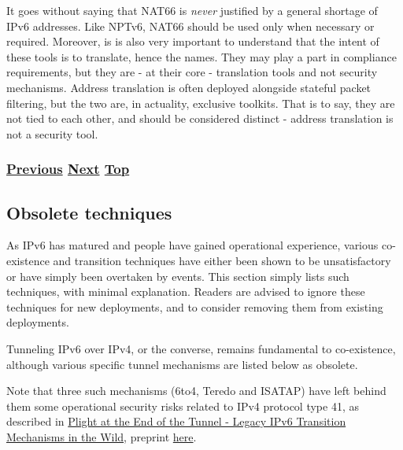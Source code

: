 \documentclass[
]{article}
\begin{document}
It goes without saying that NAT66 is \emph{never} justified by a general
shortage of IPv6 addresses. Like NPTv6, NAT66 should be used only when
necessary or required. Moreover, is is also very important to understand
that the intent of these tools is to translate, hence the names. They
may play a part in compliance requirements, but they are - at their core
- translation tools and not security mechanisms. Address translation is
often deployed alongside stateful packet filtering, but the two are, in
actuality, exclusive toolkits. That is to say, they are not tied to each
other, and should be considered distinct - address translation is not a
security tool.

\subsubsection{\texorpdfstring{\hyperref[tunnels]{Previous}
\hyperref[obsolete-techniques]{Next}
\hyperref[coexistence-with-legacy-ipv4]{Top}}{Previous Next Top}}\label{previous-next-top-20}

\pagebreak

\subsection{Obsolete techniques}\label{obsolete-techniques}

As IPv6 has matured and people have gained operational experience,
various co-existence and transition techniques have either been shown to
be unsatisfactory or have simply been overtaken by events. This section
simply lists such techniques, with minimal explanation. Readers are
advised to ignore these techniques for new deployments, and to consider
removing them from existing deployments.

Tunneling IPv6 over IPv4, or the converse, remains fundamental to
co-existence, although various specific tunnel mechanisms are listed
below as obsolete.

Note that three such mechanisms (6to4, Teredo and ISATAP) have left
behind them some operational security risks related to IPv4 protocol
type 41, as described in
\href{https://doi.org/10.1007/978-3-030-72582-2_23}{Plight at the End of
the Tunnel - Legacy IPv6 Transition Mechanisms in the Wild}, preprint
\href{https://dataplane.org/jtk/publications/kgkp-pam-21.pdf}{here}.
\end{document}
